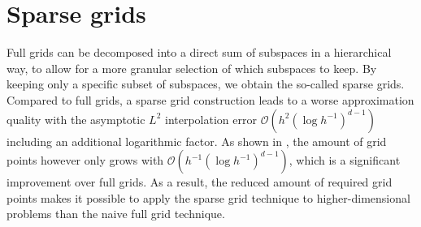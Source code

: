 \documentclass[
  a4paper,  %
  twoside,  %
  bibliography=totoc,
  headsepline,
  cleardoublepage=empty,
  parskip=half,
  draft=false
]{scrbook}
\begin{document}
\section{Sparse grids}

Full grids can be decomposed into a direct sum of subspaces in a hierarchical way, to allow for a more granular selection of which subspaces to keep.
By keeping only a specific subset of subspaces, we obtain the so-called sparse grids.
Compared to full grids, a sparse grid construction leads to a worse approximation quality with the asymptotic $L^2$ interpolation error $\mathcal{O}(h^2 (\log h^{-1})^{d-1})$ including an additional logarithmic factor.
As shown in \cite{Bungartz2004}, the amount of grid points however only grows with $\mathcal{O}(h^{-1} (\log h^{-1})^{d-1})$, which is a significant improvement over full grids.
As a result, the reduced amount of required grid points makes it possible to apply the sparse grid technique to higher-dimensional problems than the naive full grid technique.
\end{document}
